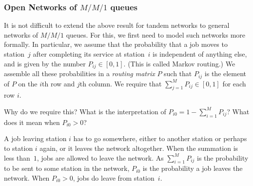 \documentclass[companion]{subfiles}
\begin{document}
\subsubsection{Open Networks of $M/M/1$ queues}
It is not difficult to extend the above result for tandem networks to general networks  of $M/M/1$ queues.
For this, we first need to model such networks more formally.
In particular, we assume that the probability that a job moves to station~$j$ after completing its service at station~$i$ is independent of anything else, and is given by the number $P_{i j}\in[0,1]$.
(This is called Markov routing.)
We assemble all these probabilities in a \emph{routing matrix} $P$ such that $P_{i j}$ is the element of $P$ on the $i$th row and $j$th column.
We require that $\sum_{j=1}^M P_{i j} \in [0, 1]$ for each row $i$. 

\begin{exercise}
  Why do we require this?
  What is the interpretation of $P_{i 0} = 1-\sum_{i=1}^M P_{i j}$? What does it mean when $P_{i 0 } > 0$?
\begin{solution}
  A job leaving station $i$ has to go somewhere, either to another station or perhaps to station $i$ again, or it leaves the network altogether.
  When the summation is less than~$1$, jobs are allowed to leave the network.
  As $\sum_{i=1}^MP_{i j}$ is the probability to be sent to some station in the network, $P_{i 0} $ is the probability a job leaves the network.
  When $P_{i 0} > 0$, jobs do leave from station~$i$.
\end{solution}
\end{exercise}
\end{document}
